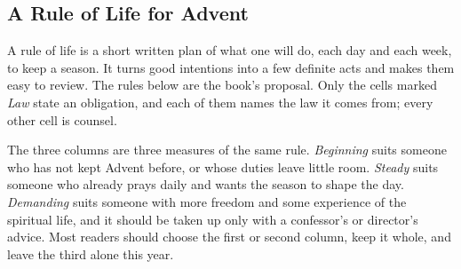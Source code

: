 \subsection{A Rule of Life for Advent}\label{sec:rule}

A rule of life is a short written plan of what one will do, each day and each week, to keep a
season. It turns good intentions into a few definite acts and makes them easy to review. The rules
below are the book's proposal. Only the cells marked \textit{Law} state an obligation, and each of
them names the law it comes from; every other cell is counsel.

The three columns are three measures of the same rule. \textit{Beginning} suits someone who has
not kept Advent before, or whose duties leave little room. \textit{Steady} suits someone who
already prays daily and wants the season to shape the day. \textit{Demanding} suits someone with
more freedom and some experience of the spiritual life, and it should be taken up only with a
confessor's or director's advice. Most readers should choose the first or second column, keep it
whole, and leave the third alone this year.

